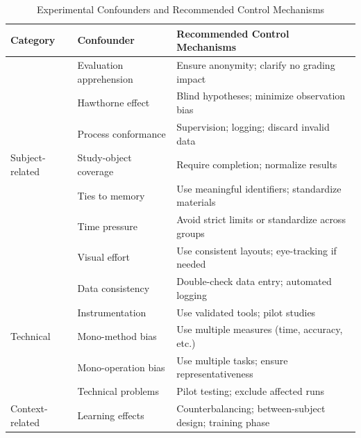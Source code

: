 \begin{table}[t]
\centering
\caption{Experimental Confounders and Recommended Control Mechanisms}
\label{tab:experimental-confounders-control}
\begin{tabular}{p{4cm} p{5.5cm} p{6.5cm}}
\toprule
\textbf{Category} & \textbf{Confounder} & \textbf{Recommended Control Mechanisms} \\
\midrule

\multirow{7}{*}{Subject-related}
& Evaluation apprehension 
& Ensure anonymity; clarify no grading impact \\

& Hawthorne effect 
& Blind hypotheses; minimize observation bias \\

& Process conformance 
& Supervision; logging; discard invalid data \\

& Study-object coverage 
& Require completion; normalize results \\

& Ties to memory 
& Use meaningful identifiers; standardize materials \\

& Time pressure 
& Avoid strict limits or standardize across groups \\

& Visual effort 
& Use consistent layouts; eye-tracking if needed \\

\midrule

\multirow{5}{*}{Technical}
& Data consistency 
& Double-check data entry; automated logging \\

& Instrumentation 
& Use validated tools; pilot studies \\

& Mono-method bias 
& Use multiple measures (time, accuracy, etc.) \\

& Mono-operation bias 
& Use multiple tasks; ensure representativeness \\

& Technical problems 
& Pilot testing; exclude affected runs \\

\midrule

\multirow{6}{*}{Context-related}
& Learning effects 
& Counterbalancing; between-subject design; training phase \\


\end{tabular}
\end{table}
